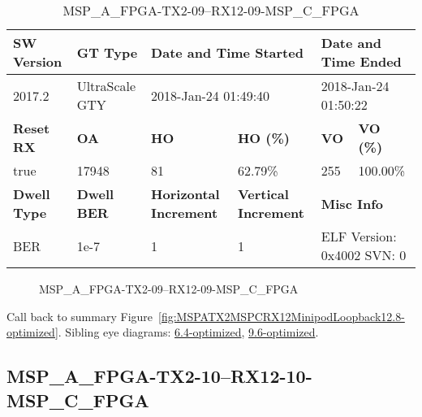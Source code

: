 \begin{table}[h]
\centering
\caption{MSP\_A\_FPGA-TX2-09--RX12-09-MSP\_C\_FPGA}
\label{tab:MSPAFPGATX209RX1209MSPCFPGA12.8-optimized}
\begin{tabular}{@{}|l|l|l|l|l|l|@{}}
\toprule
\textbf{SW Version}                & \textbf{GT Type}   & \multicolumn{2}{l|}{\textbf{Date and Time Started}}            & \multicolumn{2}{l|}{\textbf{Date and Time Ended}}        \\ \midrule
2017.2                       & UltraScale GTY          & \multicolumn{2}{l|}{2018-Jan-24 01:49:40}                   & \multicolumn{2}{l|}{2018-Jan-24 01:50:22}               \\ \midrule
\textbf{Reset RX}                  & \textbf{OA} & \textbf{HO}   & \textbf{HO (\%)} & \textbf{VO} & \textbf{VO (\%)} \\ \midrule
true & 17948        & 81          & 62.79\%        & 255        & 100.00\%       \\ \midrule
\textbf{Dwell Type}                & \textbf{Dwell BER} & \textbf{Horizontal Increment} & \textbf{Vertical Increment}    & \multicolumn{2}{l|}{\textbf{Misc Info}}                  \\ \midrule
BER                            & 1e-7        & 1        & 1           & \multicolumn{2}{l|}{ELF Version: 0x4002 SVN: 0}                         \\ \bottomrule
\end{tabular}
\end{table}

\begin{figure}[h]
\caption{MSP\_A\_FPGA-TX2-09--RX12-09-MSP\_C\_FPGA} \label{fig:MSPAFPGATX209RX1209MSPCFPGA12.8-optimized}
\end{figure}

Call back to summary Figure~\ref{fig:MSPATX2MSPCRX12MinipodLoopback12.8-optimized}.
Sibling eye diagrams: \hyperref[sec:MSPAFPGATX209RX1209MSPCFPGA6.4-optimized]{6.4-optimized}, \hyperref[sec:MSPAFPGATX209RX1209MSPCFPGA9.6-optimized]{9.6-optimized}.

\clearpage
\newpage


\subsection{MSP\_A\_FPGA-TX2-10--RX12-10-MSP\_C\_FPGA}\label{sec:MSPAFPGATX210RX1210MSPCFPGA12.8-optimized}

